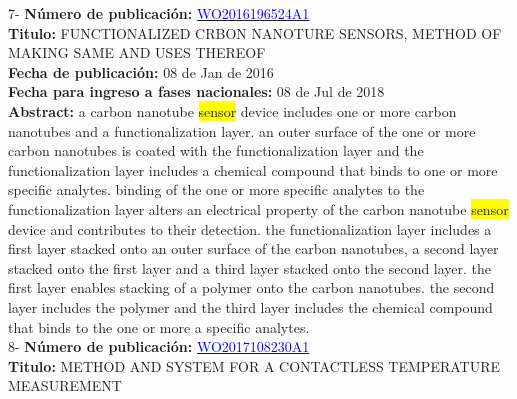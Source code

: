  \vspace{1cm}7- \textbf{Número de publicación:} \href{https://worldwide.espacenet.com/publicationDetails/biblio?DB=EPODOC&II=0&ND=3&adjacent=true&locale=en_EP&FT=D&date=20160331&CC=WO&NR=2016196524A1&KC=A1#}{\textcolor{blue}{WO2016196524A1}}\\ 
\textbf{Titulo:} FUNCTIONALIZED CRBON NANOTURE SENSORS, METHOD OF MAKING SAME AND USES THEREOF\\ 
 
\textbf{Fecha de publicación:} 08 de Jan de 2016\\ 
\textbf{Fecha para ingreso a fases nacionales:} 08 de Jul de 2018\\ 
\textbf{Abstract:} a carbon nanotube \colorbox{yellow}{sensor} device includes one or more carbon nanotubes and a functionalization layer. an outer surface of the one or more carbon nanotubes is coated with the functionalization layer and the functionalization layer includes a chemical compound that binds to one or more specific analytes. binding of the one or more specific analytes to the functionalization layer alters an electrical property of the carbon nanotube \colorbox{yellow}{sensor} device and contributes to their detection. the functionalization layer includes a first layer stacked onto an outer surface of the carbon nanotubes, a second layer stacked onto the first layer and a third layer stacked onto the second layer. the first layer enables stacking of a polymer onto the carbon nanotubes. the second layer includes the polymer and the third layer includes the chemical compound that binds to the one or more a specific analytes.\\ 
 

 \vspace{1cm}8- \textbf{Número de publicación:} \href{https://worldwide.espacenet.com/publicationDetails/biblio?DB=EPODOC&II=0&ND=3&adjacent=true&locale=en_EP&FT=D&date=20160331&CC=WO&NR=2017108230A1&KC=A1#}{\textcolor{blue}{WO2017108230A1}}\\ 
\textbf{Titulo:} METHOD AND SYSTEM FOR A CONTACTLESS TEMPERATURE MEASUREMENT\\ 
 
